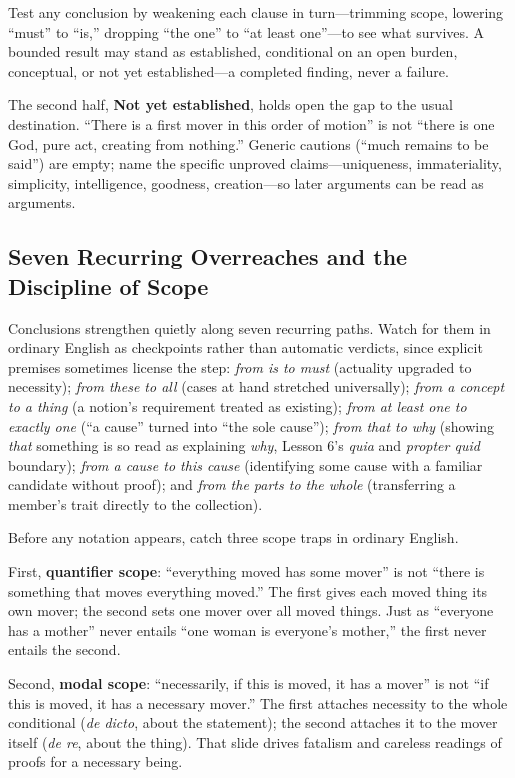 Test any conclusion by weakening each clause in turn---trimming scope, lowering ``must'' to ``is,'' dropping ``the one'' to ``at least one''---to see what survives. A bounded result may stand as established, conditional on an open burden, conceptual, or not yet established---a completed finding, never a failure.

The second half, \textbf{Not yet established}, holds open the gap to the usual destination. ``There is a first mover in this order of motion'' is not ``there is one God, pure act, creating from nothing.'' Generic cautions (``much remains to be said'') are empty; name the specific unproved claims---uniqueness, immateriality, simplicity, intelligence, goodness, creation---so later arguments can be read as arguments.

\subsection{Seven Recurring Overreaches and the Discipline of Scope}

Conclusions strengthen quietly along seven recurring paths. Watch for them in ordinary English as checkpoints rather than automatic verdicts, since explicit premises sometimes license the step: \emph{from is to must} (actuality upgraded to necessity); \emph{from these to all} (cases at hand stretched universally); \emph{from a concept to a thing} (a notion's requirement treated as existing); \emph{from at least one to exactly one} (``a cause'' turned into ``the sole cause''); \emph{from that to why} (showing \emph{that} something is so read as explaining \emph{why}, Lesson 6's \emph{quia} and \emph{propter quid} boundary); \emph{from a cause to this cause} (identifying some cause with a familiar candidate without proof); and \emph{from the parts to the whole} (transferring a member's trait directly to the collection).

Before any notation appears, catch three scope traps in ordinary English.

First, \textbf{quantifier scope}: ``everything moved has some mover'' is not ``there is something that moves everything moved.'' The first gives each moved thing its own mover; the second sets one mover over all moved things. Just as ``everyone has a mother'' never entails ``one woman is everyone's mother,'' the first never entails the second.

Second, \textbf{modal scope}: ``necessarily, if this is moved, it has a mover'' is not ``if this is moved, it has a necessary mover.'' The first attaches necessity to the whole conditional (\emph{de dicto}, about the statement); the second attaches it to the mover itself (\emph{de re}, about the thing). That slide drives fatalism and careless readings of proofs for a necessary being.

